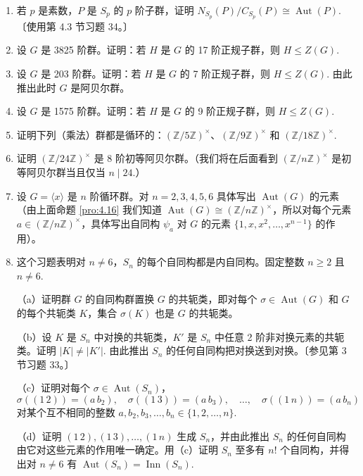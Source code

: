 \begin{enumerate}
\item 若 \(p\) 是素数，\(P\) 是 \(S_p\) 的 \(p\) 阶子群，证明 \(N_{S_p}(P)/C_{S_p}(P) \cong \operatorname{Aut}(P)\).〔使用第 4.3 节习题 34。〕

\item 设 \(G\) 是 3825 阶群。证明：若 \(H\) 是 \(G\) 的 17 阶正规子群，则 \(H \leq Z(G)\).

\item 设 \(G\) 是 203 阶群。证明：若 \(H\) 是 \(G\) 的 7 阶正规子群，则 \(H \leq Z(G)\). 由此推出此时 \(G\) 是阿贝尔群。

\item 设 \(G\) 是 1575 阶群。证明：若 \(H\) 是 \(G\) 的 9 阶正规子群，则 \(H \leq Z(G)\).

\item 证明下列（乘法）群都是循环的：\((\mathbb{Z}/5\mathbb{Z})^\times\)、\((\mathbb{Z}/9\mathbb{Z})^\times\) 和 \((\mathbb{Z}/18\mathbb{Z})^\times\).

\item 证明 \((\mathbb{Z}/24\mathbb{Z})^\times\) 是 8 阶初等阿贝尔群。（我们将在后面看到 \((\mathbb{Z}/n\mathbb{Z})^\times\) 是初等阿贝尔群当且仅当 \(n \mid 24\).）

\item 设 \(G = \langle x \rangle\) 是 \(n\) 阶循环群。对 \(n = 2, 3, 4, 5, 6\) 具体写出 \(\operatorname{Aut}(G)\) 的元素（由上面命题 \ref{pro:4.16} 我们知道 \(\operatorname{Aut}(G) \cong (\mathbb{Z}/n\mathbb{Z})^\times\)，所以对每个元素 \(a \in (\mathbb{Z}/n\mathbb{Z})^\times\)，具体写出自同构 \(\psi_a\) 对 \(G\) 的元素 \(\{1, x, x^2, \ldots, x^{n-1}\}\) 的作用）。

\item 这个习题表明对 \(n \neq 6\)，\(S_n\) 的每个自同构都是内自同构。固定整数 \(n \geq 2\) 且 \(n \neq 6\).

（a）证明群 \(G\) 的自同构群置换 \(G\) 的共轭类，即对每个 \(\sigma \in \operatorname{Aut}(G)\) 和 \(G\) 的每个共轭类 \(K\)，集合 \(\sigma(K)\) 也是 \(G\) 的共轭类。

（b）设 \(K\) 是 \(S_n\) 中对换的共轭类，\(K'\) 是 \(S_n\) 中任意 2 阶非对换元素的共轭类。证明 \(|K| \neq |K'|\). 由此推出 \(S_n\) 的任何自同构把对换送到对换。〔参见第 3 节习题 33。〕

（c）证明对每个 \(\sigma \in \operatorname{Aut}(S_n)\)，
\[
\sigma((1\,2)) = (a\,b_2), \quad \sigma((1\,3)) = (a\,b_3), \quad \ldots, \quad \sigma((1\,n)) = (a\,b_n)
\]
对某个互不相同的整数 \(a, b_2, b_3, \ldots, b_n \in \{1, 2, \ldots, n\}\).

（d）证明 \((1\,2), (1\,3), \ldots, (1\,n)\) 生成 \(S_n\)，并由此推出 \(S_n\) 的任何自同构由它对这些元素的作用唯一确定。用（c）证明 \(S_n\) 至多有 \(n!\) 个自同构，并得出对 \(n \neq 6\) 有 \(\operatorname{Aut}(S_n) = \operatorname{Inn}(S_n)\).


\end{enumerate}
